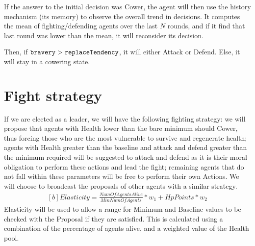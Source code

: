  If the answer to the initial decision was Cower, the agent will then use the history mechanism (its memory) to observe the overall trend in decisions. It computes the mean of fighting/defending agents over the last $N$ rounds, and if it find that last round was lower than the mean, it will reconsider its decision.

 Then, if  $\verb|bravery| > \verb|replaceTendency|$, it will either Attack or Defend. Else, it will stay in a cowering state.

\section{Fight strategy} If we are elected as a leader, we will have the following fighting strategy: we will propose that agents with Health lower than the bare minimum should Cower, thus forcing those who are the most vulnerable to survive and regenerate health; agents with Health greater than the baseline and attack and defend greater than the minimum required will be suggested to attack and defend as it is their moral obligation to perform these actions and lead the fight; remaining agents that do not fall within these parameters will be free to perform their own Actions. We will choose to broadcast the proposals of other agents with a similar strategy.
\begin{equation}
\begin{aligned}[b]
Elasticity = \frac{NumO\!f\!AgentsAlive}{MinNumO\!f\!Agents}*w_1 + HpPoints*w_2
\end{aligned}
\end{equation}
Elasticity will be used to allow a range for Minimum and Baseline values to be checked with the Proposal if they are satisfied. This is calculated using a combination of the percentage of agents alive, and a weighted value of the Health pool.



